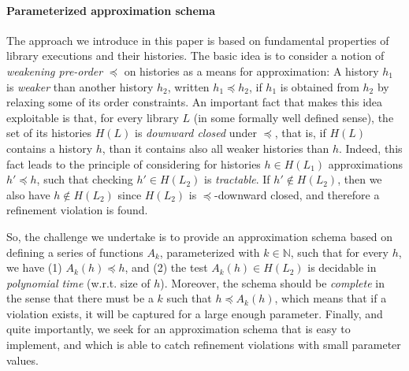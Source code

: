 \paragraph{Parameterized approximation schema} The approach we introduce in this paper is based on fundamental properties of library executions and their histories.
The basic idea is to consider a notion of {\em weakening pre-order} $\preceq$ on histories as a means for approximation: A history $h_1$ is {\em weaker} than another history $h_2$, written $h_1 \preceq h_2$, if $h_1$ is obtained from $h_2$ by relaxing some of its order constraints. An important fact that makes this idea exploitable is that, for every library $L$ (in some formally well defined sense), the set of its histories $H(L)$ is {\em downward closed} under $\preceq$, that is, if $H(L)$ contains a history $h$, than it contains also all weaker histories than $h$. Indeed, this fact leads to the principle of considering for histories $h \in H(L_1)$ approximations $h' \preceq h$, such that checking  $h'  \in H(L_2)$ is {\em tractable}. If $h'  \not\in H(L_2)$, then we also have $h  \not\in H(L_2)$ since  $H(L_2)$ is $\preceq$-downward closed, and therefore a refinement violation is found. 

So, the challenge we undertake is to provide an approximation schema based on defining a series of functions $A_k$, parameterized with $k \in \mathbb{N}$, such that for every $h$, we have (1) $A_k (h) \preceq h$, and (2) the test $A_k(h) \in H(L_2)$ is decidable in {\em polynomial time} (w.r.t. size of $h$). Moreover, the schema should be {\em complete} in the sense that there must be a $k$ such that $h \preceq A_k(h)$, which means that if a violation exists, it will be captured for a large enough parameter. Finally, and quite importantly, we seek for an approximation schema that is easy to implement, and which is able to catch refinement violations with small parameter values. 


